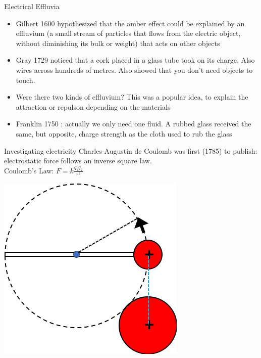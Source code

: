 \begin{frame}{Electrical Effluvia }
\small
\begin{itemize}
\item Gilbert 1600 hypothesized that the amber effect could be explained by an effluvium (a small stream of particles that flows from the electric object, without diminishing its bulk or weight) that acts on other objects
\item Gray 1729 noticed that a cork placed in a glass tube took on its charge. Also wires  across hundreds of metres. Also showed that you don't need objects to touch.\\
\item Were there two kinds of effluvium? This was a popular idea, to explain the attraction or repulson depending on the materials\\
\item Franklin 1750 : actually we only need one fluid. A rubbed glass received the same, but opposite, charge strength as the cloth used to rub the glass\\

\end{itemize}


\end{frame}



\begin{frame}{Investigating electricity}
\small
Charles-Augustin de Coulomb was first (1785) to publish: electrostatic force follows an inverse square law.\\[2ex]

Coulomb's Law: $F = k \frac{q_1 q_2}{r^2}$\\[2ex]

\begin{center}
\includegraphics[scale=0.5]{torsion}
\end{center}





\end{frame}



